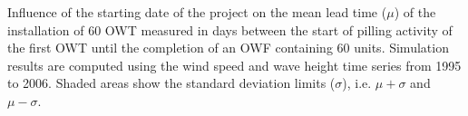 \label{fig:timeseriesmodel}
Influence of the starting date of the project on the mean lead time ($\mu$) of the installation of 60 OWT measured in days between the start of pilling activity of the first OWT until the completion of an OWF containing 60 units. Simulation results are computed using the wind speed and wave height time series from 1995 to 2006. Shaded areas show the standard deviation limits ($\sigma$), i.e. $\mu + \sigma$ and $\mu - \sigma$. 